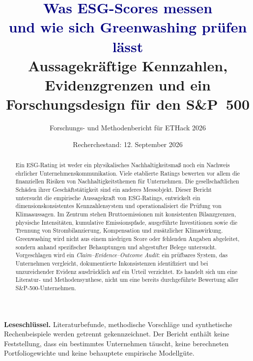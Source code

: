 \documentclass[11pt,a4paper]{article}
\title{\textcolor{navy}{Was ESG-Scores messen\vspace{2mm}\\und wie sich Greenwashing prüfen lässt}\\[5mm]\large Aussagekräftige Kennzahlen, Evidenzgrenzen und ein Forschungsdesign für den S\&P~500}
\author{Forschungs- und Methodenbericht für ETHack 2026}
\date{Recherchestand: 12. September 2026}
\begin{document}
\maketitle
\begin{abstract}
Ein ESG-Rating ist weder ein physikalisches Nachhaltigkeitsmaß noch ein Nachweis ehrlicher Unternehmenskommunikation. Viele etablierte Ratings bewerten vor allem die finanziellen Risiken von Nachhaltigkeitsthemen für Unternehmen. Die gesellschaftlichen Schäden ihrer Geschäftstätigkeit sind ein anderes Messobjekt. Dieser Bericht untersucht die empirische Aussagekraft von ESG-Ratings, entwickelt ein dimensionskonsistentes Kennzahlensystem und operationalisiert die Prüfung von Klimaaussagen. Im Zentrum stehen Bruttoemissionen mit konsistenten Bilanzgrenzen, physische Intensitäten, kumulative Emissionspfade, ausgeführte Investitionen sowie die Trennung von Strombilanzierung, Kompensation und zusätzlicher Klimawirkung. Greenwashing wird nicht aus einem niedrigen Score oder fehlenden Angaben abgeleitet, sondern anhand spezifischer Behauptungen und abgestufter Belege untersucht. Vorgeschlagen wird ein \emph{Claim--Evidence--Outcome Audit}: ein prüfbares System, das Unternehmen vergleicht, dokumentierte Inkonsistenzen identifiziert und bei unzureichender Evidenz ausdrücklich auf ein Urteil verzichtet. Es handelt sich um eine Literatur- und Methodensynthese, nicht um eine bereits durchgeführte Bewertung aller S\&P-500-Unternehmen.
\end{abstract}
\vfill
\textbf{Leseschlüssel.} Literaturbefunde, methodische Vorschläge und synthetische Rechenbeispiele werden getrennt gekennzeichnet. Der Bericht enthält keine Feststellung, dass ein bestimmtes Unternehmen täuscht, keine berechneten Portfoliogewichte und keine behauptete empirische Modellgüte.
\newpage
\tableofcontents
\newpage
\end{document}

